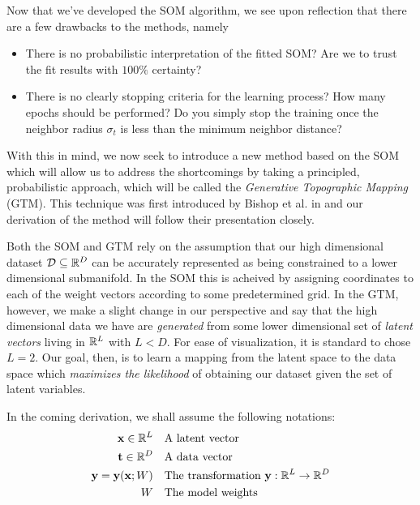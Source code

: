 Now that we've developed the SOM algorithm, we see upon reflection that there are a few drawbacks to the methods, namely
\begin{itemize}
\item There is no probabilistic interpretation of the fitted SOM? Are we to trust the fit results with $100\%$ certainty?
\item There is no clearly stopping criteria for the learning process? How many epochs should be performed? Do you simply stop the training once the neighbor radius $\sigma_t$ is less than the minimum neighbor distance?
\end{itemize}
With this in mind, we now seek to introduce a new method based on the SOM which will allow us to address the shortcomings by taking a principled, probabilistic approach, which will be called the \textit{Generative Topographic Mapping} (GTM). This technique was first introduced by Bishop et al. in  \cite{gtm-orig} and our derivation of the method will follow their presentation closely.

Both the SOM and GTM rely on the assumption that our high dimensional dataset $\mathcal{D}\subseteq\mathbb{R}^D$ can be accurately represented as being constrained to a lower dimensional submanifold. In the SOM this is acheived by assigning coordinates to each of the weight vectors according to some predetermined grid. In the GTM, however, we make a slight change in our perspective and say that the high dimensional data we have are \textit{generated} from some lower dimensional set of \textit{latent vectors} living in $\mathbb{R}^L$ with $L < D$. For ease of visualization, it is standard to chose $L=2$. Our goal, then, is to learn a mapping from the latent space to the data space which \textit{maximizes the likelihood} of obtaining our dataset given the set of latent variables.

In the coming derivation, we shall assume the following notations:
\begin{equation}
  \begin{aligned}
    \mathbf{x}\in\mathbb{R}^L &\quad \text{A latent vector} \\
    \mathbf{t}\in\mathbb{R}^D &\quad \text{A data vector}\\
    \mathbf{y}=\mathbf{y}(\mathbf{x};W) &\quad \text{The transformation } \mathbf{y}:\mathbb{R}^L\to\mathbb{R}^D \\
    W &\quad \text{The model weights}
  \end{aligned}
\end{equation}


